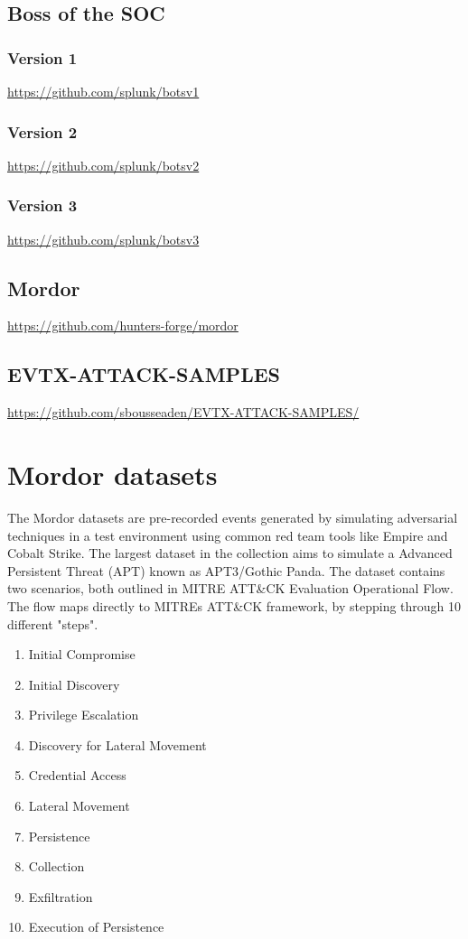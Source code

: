 \subsection{Boss of the SOC}

\subsubsection{Version 1}
\url{https://github.com/splunk/botsv1}
\subsubsection{Version 2}
\url{https://github.com/splunk/botsv2}
\subsubsection{Version 3}
\url{https://github.com/splunk/botsv3}

\subsection{Mordor}
\url{https://github.com/hunters-forge/mordor}

\subsection{EVTX-ATTACK-SAMPLES}
\url{https://github.com/sbousseaden/EVTX-ATTACK-SAMPLES/}



\section{Mordor datasets}
The Mordor datasets are pre-recorded events generated by simulating adversarial techniques in a test environment using common red team tools like Empire and Cobalt Strike. The largest dataset in the collection aims to simulate a Advanced Persistent Threat (APT) known as APT3/Gothic Panda. The dataset contains two scenarios, both outlined in MITRE ATT\&CK Evaluation Operational Flow. The flow maps directly to MITREs ATT\&CK framework, by stepping through 10 different "steps".

\begin{enumerate}
\item Initial Compromise
\item Initial Discovery
\item Privilege Escalation
\item Discovery for Lateral Movement
\item Credential Access
\item Lateral Movement
\item Persistence
\item Collection
\item Exfiltration
\item Execution of Persistence
\end{enumerate}

